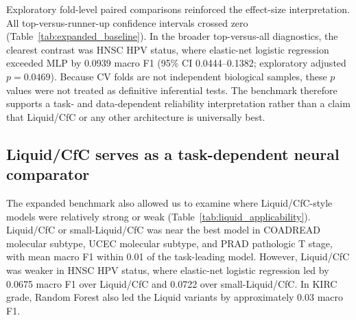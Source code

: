 \begin{table}[ht]
\centering
\caption{Best 10-fold baseline model per cancer-internal task and exploratory paired top-versus-runner-up fold-level comparison.}
\label{tab:expanded_baseline}
\end{table}

Exploratory fold-level paired comparisons reinforced the effect-size interpretation. All top-versus-runner-up confidence intervals crossed zero (Table~\ref{tab:expanded_baseline}). In the broader top-versus-all diagnostics, the clearest contrast was HNSC HPV status, where elastic-net logistic regression exceeded MLP by 0.0939 macro F1 (95\% CI 0.0444--0.1382; exploratory adjusted \(p=0.0469\)). Because CV folds are not independent biological samples, these \(p\) values were not treated as definitive inferential tests. The benchmark therefore supports a task- and data-dependent reliability interpretation rather than a claim that Liquid/CfC or any other architecture is universally best.

\subsection{Liquid/CfC serves as a task-dependent neural comparator}

The expanded benchmark also allowed us to examine where Liquid/CfC-style models were relatively strong or weak (Table~\ref{tab:liquid_applicability}). Liquid/CfC or small-Liquid/CfC was near the best model in COADREAD molecular subtype, UCEC molecular subtype, and PRAD pathologic T stage, with mean macro F1 within 0.01 of the task-leading model. However, Liquid/CfC was weaker in HNSC HPV status, where elastic-net logistic regression led by 0.0675 macro F1 over Liquid/CfC and 0.0722 over small-Liquid/CfC. In KIRC grade, Random Forest also led the Liquid variants by approximately 0.03 macro F1.

